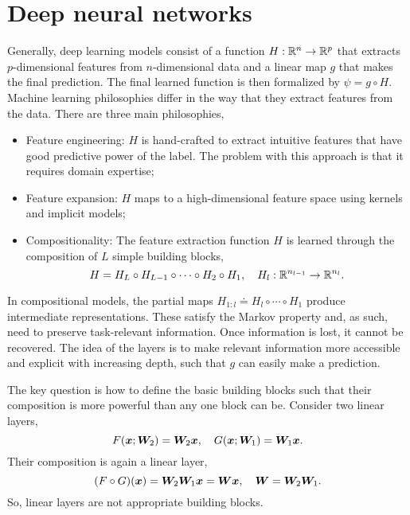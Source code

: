 \section{Deep neural networks}

Generally, deep learning models consist of a function $H: \mathbb{R}^n \to \mathbb{R}^p$ that extracts
$p$-dimensional features from $n$-dimensional data and a linear map $g$ that makes the final
prediction. The final learned function is then formalized by $\psi = g \circ H$. Machine learning
philosophies differ in the way that they extract features from the data. There are three main
philosophies,
\begin{itemize}
    \item Feature engineering: $H$ is hand-crafted to extract intuitive features that have good predictive
          power of the label. The problem with this approach is that it requires domain expertise;
    \item Feature expansion: $H$ maps to a high-dimensional feature space using kernels and implicit models;
    \item Compositionality: The feature extraction function $H$ is learned through the composition of $L$
          simple building blocks, \[
              H = H_L \circ H_{L-1} \circ \cdots \circ H_2 \circ H_1, \quad H_l : \mathbb{R}^{n_{l-1}} \to \mathbb{R}^{n_l}.
          \]
\end{itemize}

In compositional models, the partial maps $H_{1:l} \doteq H_l \circ \cdots \circ H_1$ produce
intermediate representations. These satisfy the Markov property and, as such, need to preserve
task-relevant information. Once information is lost, it cannot be recovered. The idea of the layers
is to make relevant information more accessible and explicit with increasing depth, such that $g$
can easily make a prediction.

The key question is how to define the basic building blocks such that their composition is more
powerful than any one block can be. Consider two linear layers, \[
    F(\bm{x}; \bm{W}_2) = \bm{W}_2 \bm{x}, \quad G(\bm{x}; \bm{W}_1) = \bm{W}_1 \bm{x}.
\]
Their composition is again a linear layer, \[
    (F \circ G)(\bm{x}) = \bm{W}_2 \bm{W}_1 \bm{x} = \bm{W} \bm{x}, \quad \bm{W} = \bm{W}_2 \bm{W}_1.
\]
So, linear layers are not appropriate building blocks.

